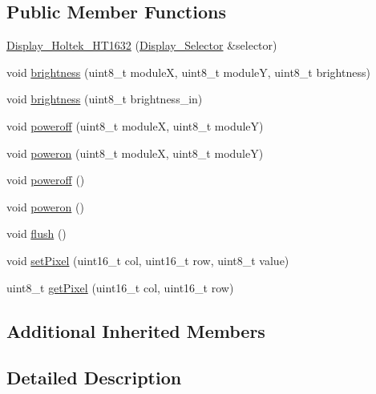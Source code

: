 \subsection*{Public Member Functions}
\begin{DoxyCompactItemize}
\item 
\hyperlink{classmhvlib_1_1_display___holtek___h_t1632_a91a6d214ae13180b8de81d43c9c8183c}{Display\-\_\-\-Holtek\-\_\-\-H\-T1632} (\hyperlink{classmhvlib_1_1_display___selector}{Display\-\_\-\-Selector} \&selector)
\item 
void \hyperlink{classmhvlib_1_1_display___holtek___h_t1632_a33a39ff7071afb676a1dbeb085b697ee}{brightness} (uint8\-\_\-t module\-X, uint8\-\_\-t module\-Y, uint8\-\_\-t brightness)
\item 
void \hyperlink{classmhvlib_1_1_display___holtek___h_t1632_a8bc85297535d36ac9de9b2d2cff51c27}{brightness} (uint8\-\_\-t brightness\-\_\-in)
\item 
void \hyperlink{classmhvlib_1_1_display___holtek___h_t1632_a90e2c554c557474310f36bdc299520f7}{poweroff} (uint8\-\_\-t module\-X, uint8\-\_\-t module\-Y)
\item 
void \hyperlink{classmhvlib_1_1_display___holtek___h_t1632_a61ecabae484631838503724ad39afc24}{poweron} (uint8\-\_\-t module\-X, uint8\-\_\-t module\-Y)
\item 
void \hyperlink{classmhvlib_1_1_display___holtek___h_t1632_a022ece4c70480a6de7cc60157a36680a}{poweroff} ()
\item 
void \hyperlink{classmhvlib_1_1_display___holtek___h_t1632_a2c9857b6fd6c4ee9299cead96ecc4a48}{poweron} ()
\item 
void \hyperlink{classmhvlib_1_1_display___holtek___h_t1632_a4b79ac1a2d1c52725a4127867d005253}{flush} ()
\item 
void \hyperlink{classmhvlib_1_1_display___holtek___h_t1632_af9e363429ca99983e9eee288fc33927f}{set\-Pixel} (uint16\-\_\-t col, uint16\-\_\-t row, uint8\-\_\-t value)
\item 
uint8\-\_\-t \hyperlink{classmhvlib_1_1_display___holtek___h_t1632_ac605b239695cbfd439ee1f5e8ec989cc}{get\-Pixel} (uint16\-\_\-t col, uint16\-\_\-t row)
\end{DoxyCompactItemize}
\subsection*{Additional Inherited Members}


\subsection{Detailed Description}
